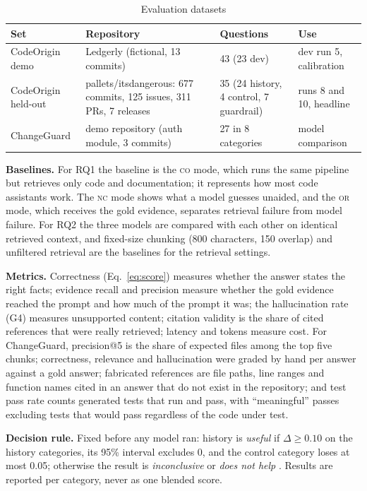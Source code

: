 \documentclass[12pt,onecolumn,draftclsnofoot]{IEEEtran}
\begin{document}
\begin{table}[!t]
\caption{Evaluation datasets}
\label{tab:data}
\centering
\small
\begin{tabular}{@{}p{3.2cm}p{4.6cm}p{2.3cm}p{3.6cm}@{}}
\toprule
Set & Repository & Questions & Use \\
\midrule
CodeOrigin demo & Ledgerly (fictional, 13 commits) & 43 (23 dev) & dev run 5, calibration \\
CodeOrigin held-out & pallets/itsdangerous: 677 commits, 125 issues, 311 PRs, 7 releases & 35 (24 history, 4 control, 7 guardrail) & runs 8 and 10, headline \\
ChangeGuard & demo repository (auth module, 3 commits) & 27 in 8 categories & model comparison \\
\bottomrule
\end{tabular}
\end{table}

\textbf{Baselines.} For RQ1 the baseline is the \textsc{co} mode, which runs the same pipeline but retrieves only code and documentation; it represents how most code assistants work. The \textsc{nc} mode shows what a model guesses unaided, and the \textsc{or} mode, which receives the gold evidence, separates retrieval failure from model failure. For RQ2 the three models are compared with each other on identical retrieved context, and fixed-size chunking (800 characters, 150 overlap) and unfiltered retrieval are the baselines for the retrieval settings.

\textbf{Metrics.} Correctness (Eq.~\ref{eq:score}) measures whether the answer states the right facts; evidence recall and precision measure whether the gold evidence reached the prompt and how much of the prompt it was; the hallucination rate (G4) measures unsupported content; citation validity is the share of cited references that were really retrieved; latency and tokens measure cost. For ChangeGuard, precision@5 is the share of expected files among the top five chunks; correctness, relevance and hallucination were graded by hand per answer against a gold answer; fabricated references are file paths, line ranges and function names cited in an answer that do not exist in the repository; and test pass rate counts generated tests that run and pass, with ``meaningful'' passes excluding tests that would pass regardless of the code under test.

\textbf{Decision rule.} Fixed before any model ran: history is \emph{useful} if $\Delta\ge0.10$ on the history categories, its 95\% interval excludes 0, and the control category loses at most 0.05; otherwise the result is \emph{inconclusive} or \emph{does not help} \cite{nosek2018prereg}. Results are reported per category, never as one blended score.
\end{document}
